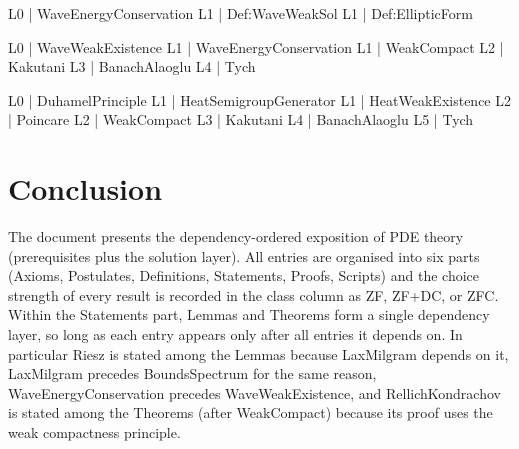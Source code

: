 \documentclass[11pt,reqno]{amsart}
\begin{document}
	\medskip
	
	\noindent%
	\begin{minipage}[t]{0.48\linewidth}
		\vspace{0pt}
		\begin{verbatimbox}
			L0 | WaveEnergyConservation
			L1 |   Def:WaveWeakSol
			L1 |   Def:EllipticForm
		\end{verbatimbox}
	\end{minipage}\hfill
	\begin{minipage}[t]{0.48\linewidth}
		\vspace{0pt}
		\begin{verbatimbox}
			L0 | WaveWeakExistence
			L1 |   WaveEnergyConservation
			L1 |   WeakCompact
			L2 |     Kakutani
			L3 |       BanachAlaoglu
			L4 |         Tych
		\end{verbatimbox}
	\end{minipage}
	
	\medskip
	
	\noindent%
	\begin{minipage}[t]{0.48\linewidth}
		\vspace{0pt}
		\begin{verbatimbox}
			L0 | DuhamelPrinciple
			L1 |   HeatSemigroupGenerator
			L1 |   HeatWeakExistence
			L2 |     Poincare
			L2 |     WeakCompact
			L3 |       Kakutani
			L4 |         BanachAlaoglu
			L5 |           Tych
		\end{verbatimbox}
	\end{minipage}
	
	\medskip
	\section{Conclusion}
	\noindent The document presents the dependency-ordered exposition of PDE
	theory (prerequisites plus the solution layer). All entries are organised into six parts (Axioms, Postulates,
	Definitions, Statements, Proofs, Scripts) and the choice strength of
	every result is recorded in the class column as \textsf{ZF},
	\textsf{ZF+DC}, or \textsf{ZFC}. Within the Statements part, Lemmas and
	Theorems form a single dependency layer, so long as each entry appears
	only after all entries it depends on. In particular \textsf{Riesz} is
	stated among the Lemmas because \textsf{LaxMilgram} depends on it,
	\textsf{LaxMilgram} precedes \textsf{BoundsSpectrum} for the same
	reason, \textsf{WaveEnergyConservation} precedes \textsf{WaveWeakExistence},
	and \textsf{RellichKondrachov} is stated among the Theorems (after
	\textsf{WeakCompact}) because its proof uses the weak compactness
	principle.
	
\end{document}
